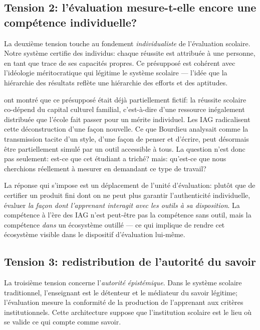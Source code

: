 \subsection*{Tension 2: l'évaluation mesure-t-elle encore une compétence individuelle?}

La deuxième tension touche au fondement \emph{individualiste} de l'évaluation scolaire. 
Notre système certifie des individus: chaque réussite est attribuée à une personne, en tant que trace de ses capacités propres. 
Ce présupposé est cohérent avec l'idéologie méritocratique qui légitime le système scolaire --- l'idée que la hiérarchie des résultats reflète une hiérarchie des efforts et des aptitudes.

\cite{pluet1971pierre} ont montré que ce présupposé était déjà partiellement fictif: la réussite scolaire co-dépend du capital culturel familial, c'est-à-dire d'une ressource inégalement distribuée que l'école fait passer pour un mérite individuel. %
Les IAG radicalisent cette déconstruction d'une façon nouvelle. 
Ce que Bourdieu analysait comme la transmission tacite d'un style, d'une façon de penser et d'écrire, peut désormais être partiellement simulé par un outil accessible à tous. 
La question n'est donc pas seulement: \og{}est-ce que cet étudiant a triché?\fg{} mais: \og{}qu'est-ce que nous cherchions réellement à mesurer en demandant ce type de travail?\fg{}

La réponse qui s'impose est un déplacement de l'unité d'évaluation: plutôt que de certifier un produit fini dont on ne peut plus garantir l'authenticité individuelle, évaluer \emph{la façon dont l'apprenant interagit avec les outils à sa disposition}. 
La compétence à l'ère des IAG n'est peut-être pas la compétence sans outil, mais la compétence \emph{dans} un écosystème outillé --- ce qui implique de rendre cet écosystème visible dans le dispositif d'évaluation lui-même.

\subsection*{Tension 3: redistribution de l'autorité du savoir}

La troisième tension concerne l'\emph{autorité épistémique}. 
Dans le système scolaire traditionnel, l'enseignant est le détenteur et le médiateur du savoir légitime; l'évaluation mesure la conformité de la production de l'apprenant aux critères institutionnels. 
Cette architecture suppose que l'institution scolaire est le lieu où se valide ce qui compte comme savoir.


